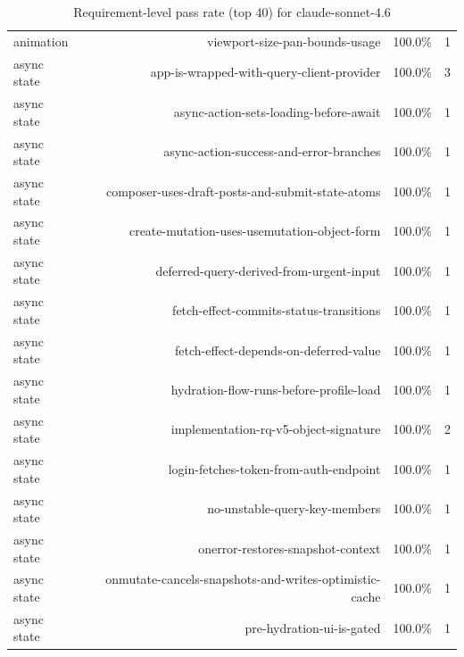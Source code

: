\begin{table}[htbp]
\begin{tabular}{lrrr}
animation & viewport-size-pan-bounds-usage & 100.0\% & 1 \\
async state & app-is-wrapped-with-query-client-provider & 100.0\% & 3 \\
async state & async-action-sets-loading-before-await & 100.0\% & 1 \\
async state & async-action-success-and-error-branches & 100.0\% & 1 \\
async state & composer-uses-draft-posts-and-submit-state-atoms & 100.0\% & 1 \\
async state & create-mutation-uses-usemutation-object-form & 100.0\% & 1 \\
async state & deferred-query-derived-from-urgent-input & 100.0\% & 1 \\
async state & fetch-effect-commits-status-transitions & 100.0\% & 1 \\
async state & fetch-effect-depends-on-deferred-value & 100.0\% & 1 \\
async state & hydration-flow-runs-before-profile-load & 100.0\% & 1 \\
async state & implementation-rq-v5-object-signature & 100.0\% & 2 \\
async state & login-fetches-token-from-auth-endpoint & 100.0\% & 1 \\
async state & no-unstable-query-key-members & 100.0\% & 1 \\
async state & onerror-restores-snapshot-context & 100.0\% & 1 \\
async state & onmutate-cancels-snapshots-and-writes-optimistic-cache & 100.0\% & 1 \\
async state & pre-hydration-ui-is-gated & 100.0\% & 1 \\
\bottomrule
\end{tabular}
\caption{Requirement-level pass rate (top 40) for claude-sonnet-4.6}
\end{table}

